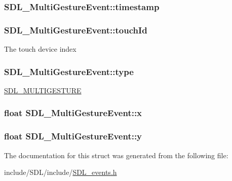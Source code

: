 \hypertarget{struct_s_d_l___multi_gesture_event_a7e99a98debf3ce11f6d2a2fbb3637175}{
\subsubsection[{timestamp}]{ S\-D\-L\-\_\-\-Multi\-Gesture\-Event\-::timestamp}}\label{struct_s_d_l___multi_gesture_event_a7e99a98debf3ce11f6d2a2fbb3637175}
\hypertarget{struct_s_d_l___multi_gesture_event_aa15d1201559a3c9277082af71a972dc1}{
\subsubsection[{touch\-Id}]{ S\-D\-L\-\_\-\-Multi\-Gesture\-Event\-::touch\-Id}}\label{struct_s_d_l___multi_gesture_event_aa15d1201559a3c9277082af71a972dc1}
The touch device index \hypertarget{struct_s_d_l___multi_gesture_event_ab0c7adc9a3f71cc3532bfe0ff8cc6120}{
\subsubsection[{type}]{ S\-D\-L\-\_\-\-Multi\-Gesture\-Event\-::type}}\label{struct_s_d_l___multi_gesture_event_ab0c7adc9a3f71cc3532bfe0ff8cc6120}
\hyperlink{_s_d_l__events_8h_a3b589e89be6b35c02e0dd34a55f3fccaaa225e29d8bf6e619dda824c81826c929}{S\-D\-L\-\_\-\-M\-U\-L\-T\-I\-G\-E\-S\-T\-U\-R\-E} \hypertarget{struct_s_d_l___multi_gesture_event_a1708fc3c788fd12cc0beb5dc05cf31ca}{
\subsubsection[{x}]{\setlength{\rightskip}{0pt plus 5cm}float S\-D\-L\-\_\-\-Multi\-Gesture\-Event\-::x}}\label{struct_s_d_l___multi_gesture_event_a1708fc3c788fd12cc0beb5dc05cf31ca}
\hypertarget{struct_s_d_l___multi_gesture_event_a264602b9c5cc027eb6a283adda428454}{
\subsubsection[{y}]{\setlength{\rightskip}{0pt plus 5cm}float S\-D\-L\-\_\-\-Multi\-Gesture\-Event\-::y}}\label{struct_s_d_l___multi_gesture_event_a264602b9c5cc027eb6a283adda428454}


The documentation for this struct was generated from the following file\-:\begin{DoxyCompactItemize}
\item 
include/\-S\-D\-L/include/\hyperlink{_s_d_l__events_8h}{S\-D\-L\-\_\-events.\-h}\end{DoxyCompactItemize}

